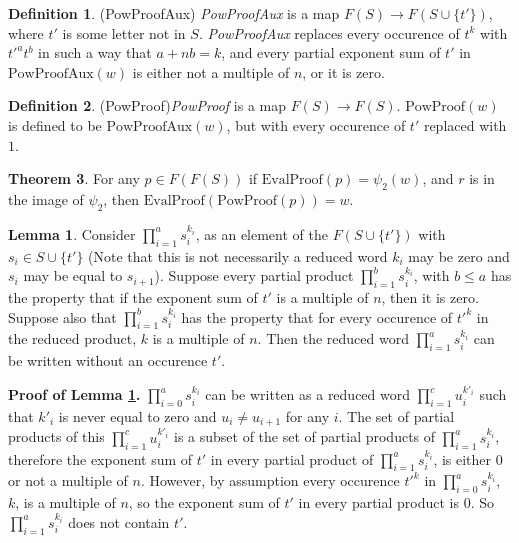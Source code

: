 \documentclass[11pt]{article} %
\theoremstyle{definition}
\newtheorem{theorem}{Theorem}[section]
\theoremstyle{definition}
\theoremstyle{definition}
\theoremstyle{definition}
\newtheorem{sublemma}{Lemma}[theorem]
\theoremstyle{definition}
\newtheorem{defn}[theorem]{Definition}
\theoremstyle{definition}
\begin{document}
\begin{defn}(PowProofAux)
  \textit{PowProofAux} is a map $F(S) \to F(S \cup \{t'\})$, where $t'$ is some letter not in $S$.
  \textit{PowProofAux} replaces every occurence of $t^k$ with $t'^at^b$ in such a way that $a + n b = k$,
  and every partial exponent sum of $t'$ in $\text{PowProofAux}(w)$ is either not a multiple of $n$,
  or it is zero.
\end{defn}

\begin{defn}(PowProof)\label{PowProof}
  \textit{PowProof} is a map $F(S) \to F(S)$. $\text{PowProof}(w)$ is defined to be
  $\text{PowProofAux}(w)$, but with every occurence of $t'$ replaced with $1$.
\end{defn}

\begin{theorem}\label{powproof}
  For any $p \in F(F(S))$ if $\text{EvalProof}(p) = \psi_2(w)$, and $r$ is
  in the image of $\psi_2$, then $\text{EvalProof}(\text{PowProof}(p)) = w$.
\end{theorem}

\begin{sublemma}\label{powproof1}
  Consider $\prod_{i = 1}^a s_i^{k_i}$, as an element of the $F(S \cup \{t'\})$
  with $s_i \in S \cup \{t'\}$ (Note that this is not necessarily a reduced
  word $k_i$ may be zero and $s_i$ may be equal to $s_{i+1}$).
  Suppose every partial product $\prod_{i=1}^b s_i^{k_i}$,
  with $b \le a$ has the property that if the exponent sum of $t'$ is a multiple
  of $n$, then it is zero. Suppose also that $\prod_{i = 1}^b s_i^{k_i}$ has the
  property that for every occurence of $t'^k$ in the reduced product, $k$ is a multiple of
  $n$. Then the reduced word $\prod_{i = 1}^a s_i^{k_i}$
  can be written without an occurence $t'$.
\end{sublemma}

\textbf{Proof of Lemma \ref{powproof1}.} $\prod_{i=0}^a s_i^{k_i}$ can be written as a reduced
word $\prod_{i = 1}^{c} u_i^{k'_i}$ such that $k'_i$ is never equal to zero and
$u_i \ne u_{i+1}$ for any $i$. The set of partial products of this
$\prod_{i = 1}^{c} u_i^{k'_i}$ is a subset of the set of partial products of $\prod_{i=1}^a s_i^{k_i}$,
therefore the exponent sum of $t'$ in every partial product of $\prod_{i=1}^a s_i^{k_i}$, is
either $0$ or not a multiple of $n$. However, by assumption every occurence $t'^k$ in
$\prod_{i=0}^a s_i^{k_i}$, $k$, is a multiple of $n$, so the exponent sum of $t'$ in every
partial product is $0$. So $\prod_{i=1}^a s_i^{k_i}$ does not contain $t'$.
\end{document}

